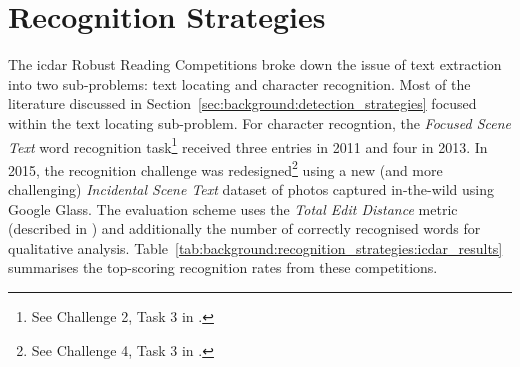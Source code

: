\section{Recognition Strategies}
\label{sec:background:recognition_strategies}

The \gls{icdar} Robust Reading Competitions \citep{Lucas:2003iw, Lucas:2005bq, Shahab:2011hq, Karatzas:2013by, Karatzas:2015tj} broke down the issue of text extraction into two sub-problems: text locating and character recognition. Most of the literature discussed in Section~\ref{sec:background:detection_strategies} focused within the text locating sub-problem. For character recogntion, the \textit{Focused Scene Text} word recognition task\footnote{See Challenge 2, Task 3 in \citep{Shahab:2011hq, Karatzas:2013by}.} received three entries in 2011 and four in 2013. In 2015, the recognition challenge was redesigned\footnote{See Challenge 4, Task 3 in \citep{Karatzas:2015tj}.} using a new (and more challenging) \textit{Incidental Scene Text} dataset of photos captured in-the-wild using Google Glass. The evaluation scheme uses the \textit{Total Edit Distance} metric (described in \citep{Karatzas:2013by}) and additionally the number of correctly recognised words for qualitative analysis. Table~\ref{tab:background:recognition_strategies:icdar_results} summarises the top-scoring recognition rates from these competitions.

\begin{table}[bh]
  \centering
  \caption{Top-scoring word recognition results from ICDAR 2011--2015.}
  \label{tab:background:recognition_strategies:icdar_results}
\end{table}

